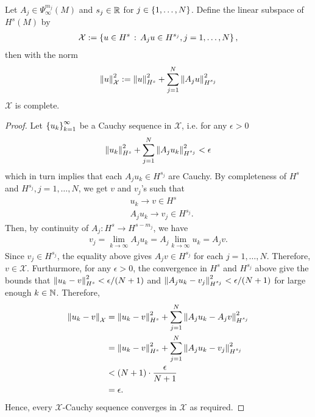 \documentclass[12pt]{article}
\begin{document}
\begin{flemma} \label{lemma: sub-sobolev space} 
    Let $A_j \in \Psi^{m_j}_{\infty}(M)$ and $s_j \in \R$ for $j \in \set{1, \dots, N}$. Define the linear subspace of $H^{s}(M)$ by 
    \begin{align*}
    \mathcal{X} := \set{u \in H^{s} \wh A_ju \in H^{s_j}, j = 1, \dots, N},
    \end{align*}
    then with the norm
    \begin{align*}
    \norm[u]_{\mathcal{X}}^2 := \norm[u]_{H^s}^2 + \sum_{j = 1}^N \norm[A_j u]_{H^{s_j}}^2
    \end{align*}
    $\mathcal{X}$ is complete. 
\end{flemma}
\begin{proof}
    Let $\set{u_k}_{k=1}^\infty $ be a Cauchy sequence in $\mathcal{X}$, i.e. for any $\epsilon > 0$
    \begin{align*}
    \norm[u_k]_{H^s}^2 + \sum_{j = 1}^N \norm[A_j u_k]_{H^{s_j}}^2 < \epsilon
    \end{align*}
    which in turn implies that each $A_ju_k \in H^{s_j}$ are Cauchy. By completeness of $H^s$ and $H^{s_j}, j = 1, \dots, N$, we get $v$ and $v_j$'s such that 
    \begin{align*}
    &u_k \to v \in H^s\\
    &A_j u_k \to v_j \in H^{s_j}. 
    \end{align*}
    Then, by continuity of $A_j : H^s \to H^{s - m_j}$, we have 
    \begin{align*}
    v_j = \lim_{k \to \infty} A_j u_k = A_j \lim_{k \to \infty}u_k = A_j v. 
    \end{align*}
    Since $v_j \in H^{s_j}$, the equality above gives $A_jv \in H^{s_j}$ for each $j = 1, \dots, N$. Therefore, $v \in \mathcal{X}$. Furthurmore, for any $\epsilon > 0$, the convergence in $H^s$ and $H^{s_j}$ above give the bounds that $ \norm[u_k - v]_{H^s}^2 < \epsilon / (N + 1)$ and $\norm[A_j u_k - v_j]_{H^{s_j}}^2 < \epsilon / (N +1)$ for large enough $k \in \N$. Therefore, 
    \begin{align*}
    \norm[u_k - v]_{\mathcal{X}} 
    &= \norm[u_k - v]_{H^s}^2 + \sum_{j = 1}^N \norm[A_j u_k - A_jv]_{H^{s_j}}^2\\
    &= \norm[u_k - v]_{H^s}^2 + \sum_{j = 1}^N \norm[A_j u_k - v_j]_{H^{s_j}}^2 \\
    & < (N + 1) \cdot \frac{\epsilon}{N + 1} \\
    & = \epsilon. 
    \end{align*}
    Hence, every $\mathcal{X}$-Cauchy sequence converges in $\mathcal{X}$ as required. 
    
\end{proof}
\end{document}
